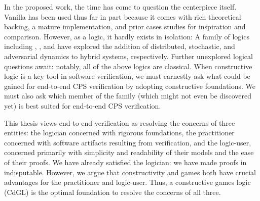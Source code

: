 \documentclass[12pt]{cmuthesis}
\theoremstyle{definition}
\theoremstyle{remark}
\newcommand{\CdGL}{\textsf{CdGL}\xspace}
\begin{document}
In the proposed work, the time has come to question the centerpiece itself.
Vanilla \dL has been used thus far in part because it comes with rich theoretical backing, a mature implementation, and prior cases studies for inspiration and comparison.
However, as a logic, it hardly exists in isolation: A family of logics including \QdL, \SdL, and \dGL have explored the addition of distributed, stochastic, and adversarial dynamics to hybrid systems, respectively.
Further unexplored logical questions await: notably, all of the above logics are classical.
When constructive logic is a key tool in software verification, we must earnestly ask what could be gained for end-to-end CPS verification by adopting constructive foundations.
We must also ask which member of the \dL family (which might not even be discovered yet) is best suited for end-to-end CPS verification.

This thesis views end-to-end verification as resolving the concerns of three entities:
the logician concerned with rigorous foundations, the practitioner concerned with software artifacts resulting from verification, and the logic-user, concerned primarily with simplicity and readability of their models and the ease of their proofs.
We have already satisfied the logician: we have made \dL proofs in \KeYmaeraX indisputable.
However, we argue that constructivity and games both have crucial advantages for the practitioner and logic-user.
Thus, a constructive games logic (\CdGL) is the optimal foundation to resolve the concerns of all three.
\end{document}
